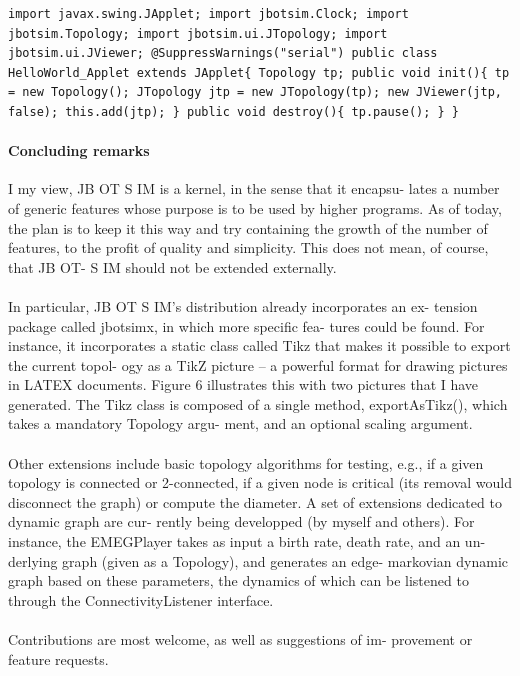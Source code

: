 \begin{lstlisting}
import javax.swing.JApplet; import jbotsim.Clock; import jbotsim.Topology; import jbotsim.ui.JTopology; import jbotsim.ui.JViewer; @SuppressWarnings("serial") public class HelloWorld_Applet extends JApplet{ Topology tp; public void init(){ tp = new Topology(); JTopology jtp = new JTopology(tp); new JViewer(jtp, false); this.add(jtp); } public void destroy(){ tp.pause(); } }
\end{lstlisting}

\paragraph{Concluding remarks}I my view, JB OT S IM is a kernel, in the sense that it encapsu- lates a number of generic features whose purpose is to be used by higher programs. As of today, the plan is to keep it this way and try containing the growth of the number of features, to the profit of quality and simplicity. This does not mean, of course, that JB OT- S IM should not be extended externally.
\paragraph{}In particular, JB OT S IM’s distribution already incorporates an ex- tension package called jbotsimx, in which more specific fea- tures could be found. For instance, it incorporates a static class called Tikz that makes it possible to export the current topol- ogy as a TikZ picture – a powerful format for drawing pictures in LATEX documents. Figure 6 illustrates this with two pictures that I have generated. The Tikz class is composed of a single method, exportAsTikz(), which takes a mandatory Topology argu- ment, and an optional scaling argument.
\paragraph{}Other extensions include basic topology algorithms for testing, e.g., if a given topology is connected or 2-connected, if a given node is critical (its removal would disconnect the graph) or compute the diameter. A set of extensions dedicated to dynamic graph are cur- rently being developped (by myself and others). For instance, the EMEGPlayer takes as input a birth rate, death rate, and an un- derlying graph (given as a Topology), and generates an edge- markovian dynamic graph based on these parameters, the dynamics of which can be listened to through the ConnectivityListener interface.
\paragraph{}Contributions are most welcome, as well as suggestions of im- provement or feature requests.

